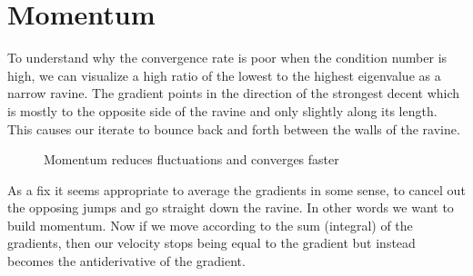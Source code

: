 
\chapter{Momentum}

To understand why the convergence rate is poor when the condition
number is high, we can visualize a high ratio of the lowest to the highest
eigenvalue as a narrow ravine. The gradient points in the direction of the
strongest decent which is mostly to the opposite side of the ravine and only slightly
along its length. This causes our iterate to bounce back and forth between
the walls of the ravine.
%
\begin{figure}[h]
	\centering
	\def\svgwidth{1\textwidth}
	
	\caption{Momentum reduces fluctuations and converges faster}
	\label{fig: visualize bad conditioning}
\end{figure}

As a fix it seems appropriate to average the gradients in some sense, to
cancel out the opposing jumps and go straight down the ravine. In other words
we want to build momentum. Now if we move according to the sum (integral) of
the gradients, then our velocity stops being equal to the gradient but instead
becomes the antiderivative of the gradient.


